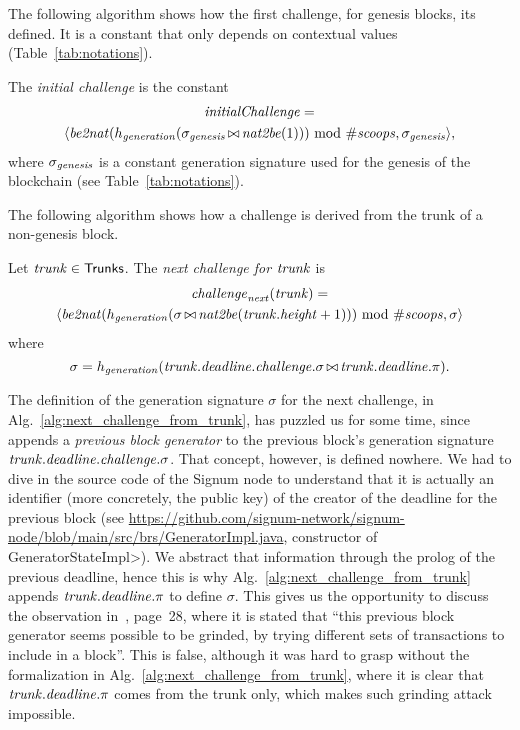 The following algorithm shows how the first challenge, for genesis blocks,
its defined. It is a constant that only depends on contextual values (Table~\ref{tab:notations}).
%
\begin{alg}[$\initialchallenge$]\label{alg:initial_challenge}
  The \emph{initial challenge} is the constant
  \begin{multline*}
    {\mathit{initialChallenge}}=\\
    \langle{\mathit{be2nat}}(h_{\mathit{generation}}(\sigma_{\mathit{genesis}}\operatorname*{\bowtie}{\mathit{nat2be}}(1)))\text{ mod }{\#\mathit{scoops}},\sigma_{\mathit{genesis}}\rangle,
  \end{multline*}
  where $\sigma_{\mathit{genesis}}$ is a constant generation signature used for the genesis of the blockchain
  (see Table~\ref{tab:notations}).
\end{alg}
%
The following algorithm shows how a challenge is derived from the trunk of a non-genesis block.
%
\begin{alg}[$\nextchallenge(\trunk)$]\label{alg:next_challenge_from_trunk}
  Let ${\mathit{trunk}}\in{\mathsf{Trunks}}$. The \emph{next challenge for ${\mathit{trunk}}$} is
  \begin{multline*}
    {\mathit{challenge}}_{\mathit{next}}({\mathit{trunk}})=\\
    \langle{\mathit{be2nat}}(h_{\mathit{generation}}(\sigma\operatorname*{\bowtie}{\mathit{nat2be}}({\mathit{trunk}}.{\mathit{height}}+1)))\text{ mod }{\#\mathit{scoops}},\sigma\rangle
  \end{multline*}
  where
  \[
  \sigma=h_{\mathit{generation}}({\mathit{trunk}}.{\mathit{deadline}}.{\mathit{challenge}}.\sigma\operatorname*{\bowtie}{\mathit{trunk}}.{\mathit{deadline}}.\pi).  
  \]
\end{alg}
%
The definition of the generation signature $\sigma$ for the next challenge,
in Alg.~\ref{alg:next_challenge_from_trunk},
has puzzled us for some time, since~\cite{SignumPlotting} appends a \emph{previous block generator}
to the previous block's generation signature ${\mathit{trunk}}.{\mathit{deadline}}.{\mathit{challenge}}.\sigma$.
That concept, however, is defined nowhere.
We had to dive in the source code of the Signum node
to understand that it is actually
an identifier (more concretely, the public key)
of the creator of the deadline for the previous block
(see \url{https://github.com/signum-network/signum-node/blob/main/src/brs/GeneratorImpl.java}, constructor of \<GeneratorStateImpl>).
We abstract that information through the prolog of the previous deadline, hence this is why
Alg.~\ref{alg:next_challenge_from_trunk} appends
${\mathit{trunk}}.{\mathit{deadline}}.\pi$ to define $\sigma$.
This gives us the opportunity to discuss the observation in~\cite{ParkPAFG15}, page~28,
where it is stated that ``this previous block generator seems possible to be grinded, by trying
different sets of transactions to include in a block''. This is false, although it was
hard to grasp without the formalization in
Alg.~\ref{alg:next_challenge_from_trunk}, where it is clear that
${\mathit{trunk}}.{\mathit{deadline}}.\pi$ comes from the trunk only, which makes
such grinding attack impossible.

